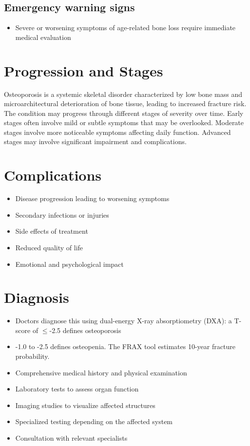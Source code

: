 \subsection{Emergency warning signs}
\begin{itemize}[noitemsep]
  \item Severe or worsening symptoms of age-related bone loss require immediate medical evaluation
\end{itemize}
\section{Progression and Stages}
Osteoporosis is a systemic skeletal disorder characterized by low bone mass and microarchitectural deterioration of bone tissue, leading to increased fracture risk. The condition may progress through different stages of severity over time. Early stages often involve mild or subtle symptoms that may be overlooked. Moderate stages involve more noticeable symptoms affecting daily function. Advanced stages may involve significant impairment and complications.
\section{Complications}
\begin{itemize}[noitemsep]
  \item Disease progression leading to worsening symptoms
  \item Secondary infections or injuries
  \item Side effects of treatment
  \item Reduced quality of life
  \item Emotional and psychological impact
\end{itemize}
\section{Diagnosis}
\begin{itemize}[noitemsep]
  \item Doctors diagnose this using dual-energy X-ray absorptiometry (DXA): a T-score of $\leq$-2.5 defines osteoporosis
  \item -1.0 to -2.5 defines osteopenia. The FRAX tool estimates 10-year fracture probability.
  \item Comprehensive medical history and physical examination
  \item Laboratory tests to assess organ function
  \item Imaging studies to visualize affected structures
  \item Specialized testing depending on the affected system
  \item Consultation with relevant specialists
\end{itemize}

